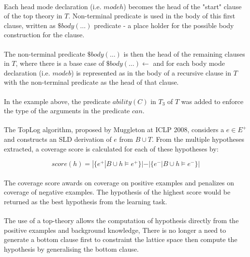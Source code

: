 \documentclass{article}
\theoremstyle{plain}
\theoremstyle{definition}
\begin{document}
\begin{multicols}{2}
\paragraph{} Each head mode declaration (i.e. $modeh$) becomes the head of the "start" clause of the top theory in $T$. Non-terminal predicate is used in the body of this first clause, written as $\$body(\dots)$ predicate - a place holder for the possible body construction for the clause.

\paragraph{} The non-terminal predicate $\$body(\dots)$ is then the head of the remaining clauses in $T$, where there is a base case of $\$body(\dots) \leftarrow$ and for each body mode declaration (i.e. $modeb$) is represented as in the body of a recursive clause in $T$ with the non-terminal predicate as the head of that clause.

\paragraph{} In the example above, the predicate $ability(C)$ in $T_3$ of $T$ was added to enforce the type of the arguments in the predicate $can$.

\paragraph{} The TopLog algorithm, proposed by Muggleton at ICLP 2008, considers a $e \in E^+$ and constructs an SLD derivation of $e$ from $B \cup T$. From the multiple hypotheses extracted, a coverage score is calculated for each of these hypotheses by:

$$score(h) = |\{e^+  | B \cup h \models e^+\}| - |\{e^- | B \cup h \models e^-\}|$$

\paragraph{} The coverage score awards on coverage on positive examples and penalizes on coverage of negative examples. The hypothesis of the highest score would be returned as the best hypothesis from the learning task.

\paragraph{} The use of a top-theory allows the computation of hypothesis directly from the positive examples and background knowledge, There is no longer a need to generate a bottom clause first to constraint the lattice space then compute the hypothesis by generalising the bottom clause.


\end{multicols}
\end{document}
